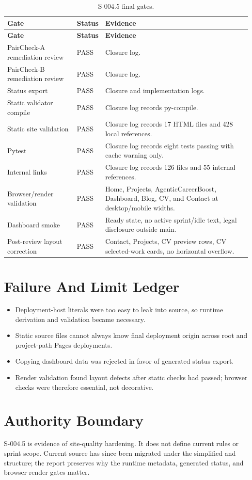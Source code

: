 \documentclass[a4paper,11pt,openany]{report}
\begin{document}
\begin{longtable}{p{} p{} p{}}
\caption{S-004.5 final gates.}\\
\toprule
\textbf{Gate} & \textbf{Status} & \textbf{Evidence} \\
\midrule
\endfirsthead
\toprule
\textbf{Gate} & \textbf{Status} & \textbf{Evidence} \\
\midrule
\endhead
PairCheck-A remediation review & PASS & Closure log. \\
PairCheck-B remediation review & PASS & Closure log. \\
Status export & PASS & Closure and implementation logs. \\
Static validator compile & PASS & Closure log records py-compile. \\
Static site validation & PASS & Closure log records 17 HTML files and 428 local references. \\
Pytest & PASS & Closure log records eight tests passing with cache warning only. \\
Internal links & PASS & Closure log records 126 files and 55 internal references. \\
Browser/render validation & PASS & Home, Projects, AgenticCareerBoost, Dashboard, Blog, CV, and Contact at desktop/mobile widths. \\
Dashboard smoke & PASS & Ready state, no active sprint/idle text, legal disclosure outside main. \\
Post-review layout correction & PASS & Contact, Projects, CV preview rows, CV selected-work cards, no horizontal overflow. \\
\bottomrule
\end{longtable}

\chapter{Failure And Limit Ledger}

\begin{itemize}
  \item Deployment-host literals were too easy to leak into source, so runtime
    derivation and validation became necessary.
  \item Static source files cannot always know final deployment origin across
    root and project-path Pages deployments.
  \item Copying dashboard data was rejected in favor of generated status export.
  \item Render validation found layout defects after static checks had passed;
    browser checks were therefore essential, not decorative.
\end{itemize}

\chapter{Authority Boundary}

S-004.5 is evidence of site-quality hardening. It does not define current rules
or sprint scope. Current source has since been migrated under the simplified
 and  structure; the report preserves why the
runtime metadata, generated status, and browser-render gates matter.
\end{document}
